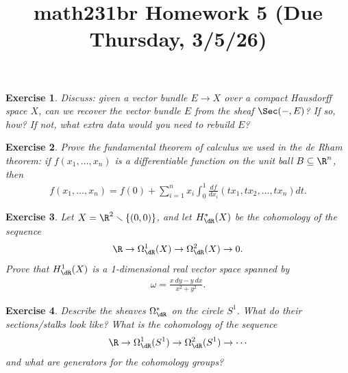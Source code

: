 \documentclass[11pt]{amsart}
\title{math231br Homework 5 (Due Thursday, 3/5/26)}
\newtheorem{hwexercise}{Exercise}
\begin{document}
\maketitle

\begin{hwexercise} Discuss: given a vector bundle $E \to X$ over a compact Hausdorff space $X$, can we recover the vector bundle $E$ from the sheaf $\Sec(-,E)$? If so, how? If not, what extra data would you need to rebuild $E$?
\end{hwexercise}


\begin{hwexercise} Prove the fundamental theorem of calculus we used in the de Rham theorem: if $f(x_1, \ldots, x_n)$ is a differentiable function on the unit ball $B \subseteq \R^n$, then
\begin{align*}
    f(x_1, \ldots, x_n) = f(0)+ \sum_{i=1}^n x_i \int_0^1 \frac{df}{dx_i}(tx_1,tx_2, \ldots, tx_n) dt.
\end{align*}
\end{hwexercise}

\begin{hwexercise}
Let $X = \R^2\minus\{(0,0)\}$, and let $H^\ast_\dR(X)$ be the cohomology of the sequence
\begin{align*}
    \R \to \Omega^1_\dR(X) \to \Omega^2_\dR(X) \to 0.
\end{align*}
Prove that $H^1_\dR(X)$ is a 1-dimensional real vector space spanned by
\begin{align*}
    \omega = \frac{x\ dy - y\ dx}{x^2+y^2}.
\end{align*}
\end{hwexercise}

\begin{hwexercise}
Describe the sheaves $\Omega^\ast_\dR$ on the circle $S^1$. What do their sections/stalks look like? What is the cohomology of the sequence
\begin{align*}
    \R \to \Omega^1_\dR(S^1) \to \Omega^2_\dR(S^1) \to \cdots
\end{align*}
and what are generators for the cohomology groups?
\end{hwexercise}
\end{document}
